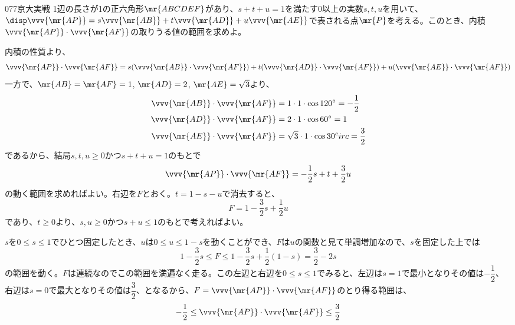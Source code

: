 \begin{thm}{077}{}{京大実戦}
 1辺の長さが1の正六角形$\mr{ABCDEF}$があり、$s+t+u=1$を満たす0以上の実数$s, t, u$を用いて、$\disp \vvv{\mr{AP}}=s\vvv{\mr{AB}}+t\vvv{\mr{AD}}+u\vvv{\mr{AE}}$で表される点$\mr{P}$を考える。このとき、内積$\vvv{\mr{AP}}\cdot\vvv{\mr{AF}}$の取りうる値の範囲を求めよ。
\end{thm}

内積の性質より、
\[ \vvv{\mr{AP}}\cdot\vvv{\mr{AF}}=s(\vvv{\mr{AB}}\cdot\vvv{\mr{AF}})+t(\vvv{\mr{AD}}\cdot\vvv{\mr{AF}})+u(\vvv{\mr{AE}}\cdot\vvv{\mr{AF}}) \]
一方で、$\mr{AB}=\mr{AF}=1$, $\mr{AD}=2$, $\mr{AE}=\sqrt{3}$より、
\begin{align*}
 \vvv{\mr{AB}}\cdot\vvv{\mr{AF}}&=1\cdot 1\cdot \cos 120^\circ=-\frac{1}{2} \\
 \vvv{\mr{AD}}\cdot\vvv{\mr{AF}}&=2\cdot 1\cdot \cos 60^\circ=1 \\
 \vvv{\mr{AE}}\cdot\vvv{\mr{AF}}&=\sqrt{3}\cdot 1\cdot \cos 30^circ=\frac{3}{2}
\end{align*}
であるから、結局$s, t, u\ge 0$かつ$s+t+u=1$のもとで
\[ \vvv{\mr{AP}}\cdot\vvv{\mr{AF}}=-\frac{1}{2}s+t+\frac{3}{2}u \]
の動く範囲を求めればよい。右辺を$F$とおく。$t=1-s-u$で消去すると、
\[ F=1-\frac{3}{2}s+\frac{1}{2}u \]
であり、$t\ge 0$より、$s, u\ge 0$かつ$s+u\le 1$のもとで考えればよい。

$s$を$0\le s\le 1$でひとつ固定したとき、$u$は$0\le u\le 1-s$を動くことができ、$F$は$u$の関数と見て単調増加なので、$s$を固定した上では
\[ 1-\frac{3}{2}s\le F\le 1-\frac{3}{2}s+\frac{1}{2}(1-s) = \frac{3}{2}-2s \]
の範囲を動く。$F$は連続なのでこの範囲を満遍なく走る。この左辺と右辺を$0\le s\le 1$でみると、左辺は$s=1$で最小となりその値は$-\dfrac{1}{2}$、右辺は$s=0$で最大となりその値は$\dfrac{3}{2}$、となるから、$F=\vvv{\mr{AP}}\cdot\vvv{\mr{AF}}$のとり得る範囲は、
\[ -\frac{1}{2}\le \vvv{\mr{AP}}\cdot\vvv{\mr{AF}}\le \frac{3}{2} \]